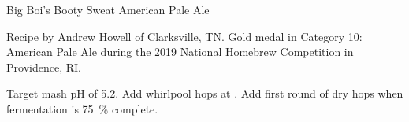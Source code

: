 \begin{recipe}{Big Boi's Booty Sweat American Pale Ale} %

\begin{aboutblock}
Recipe by Andrew Howell of Clarksville, TN. Gold medal in Category 10: American
Pale Ale during the 2019 National Homebrew Competition in Providence, RI.
\sourceaha
\end{aboutblock}


\begin{methodandtiming}

\begin{mashsteps}
\end{mashsteps}

\begin{fermentationsteps}
\end{fermentationsteps}

\begin{directions}
Target mash pH of 5.2. Add whirlpool hops at . Add first round
of dry hops when fermentation is 75~\% complete.
\end{directions}

\end{methodandtiming}

\recipebreak

\begin{ingredientsblock}

\begin{malts}
\end{malts}

\begin{hops}
\end{hops}


\end{ingredientsblock}

\end{recipe}

